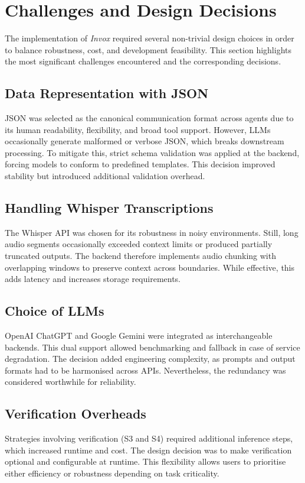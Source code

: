 \section{Challenges and Design Decisions}

The implementation of \textit{Invox} required several non-trivial design choices in order to balance robustness, cost, and development feasibility. This section highlights the most significant challenges encountered and the corresponding decisions.

\subsection*{Data Representation with JSON}
JSON was selected as the canonical communication format across agents due to its human readability, flexibility, and broad tool support. However, LLMs occasionally generate malformed or verbose JSON, which breaks downstream processing. To mitigate this, strict schema validation was applied at the backend, forcing models to conform to predefined templates. This decision improved stability but introduced additional validation overhead.

\subsection*{Handling Whisper Transcriptions}
The Whisper API was chosen for its robustness in noisy environments. Still, long audio segments occasionally exceeded context limits or produced partially truncated outputs. The backend therefore implements audio chunking with overlapping windows to preserve context across boundaries. While effective, this adds latency and increases storage requirements.

\subsection*{Choice of LLMs}
OpenAI ChatGPT and Google Gemini were integrated as interchangeable backends. This dual support allowed benchmarking and fallback in case of service degradation. The decision added engineering complexity, as prompts and output formats had to be harmonised across APIs. Nevertheless, the redundancy was considered worthwhile for reliability.

\subsection*{Verification Overheads}
Strategies involving verification (S3 and S4) required additional inference steps, which increased runtime and cost. The design decision was to make verification optional and configurable at runtime. This flexibility allows users to prioritise either efficiency or robustness depending on task criticality.

